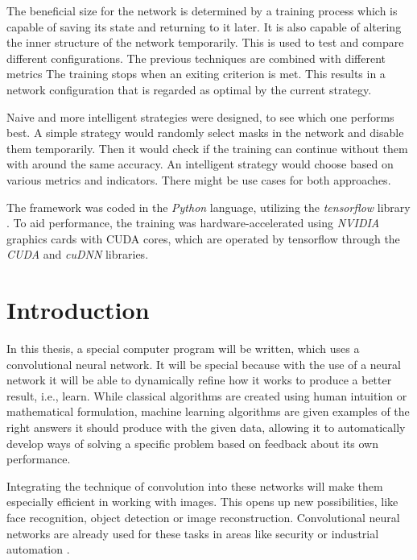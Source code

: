 \documentclass[12pt]{report}
\begin{document}
The beneficial size for the network is determined by a training process which is capable of saving its state and returning to it later. It is also capable of altering the inner structure of the network temporarily. This is used to test and compare different configurations. The previous techniques are combined with different metrics The training stops when an exiting criterion is met. This results in a network configuration that is regarded as optimal by the current strategy.

Naive and more intelligent strategies were designed, to see which one performs best. A simple strategy would randomly select masks in the network and disable them temporarily. Then it would check if the training can continue without them with around the same accuracy. An intelligent strategy would choose based on various metrics and indicators. There might be use cases for both approaches.

The framework was coded in the \textit{Python} language, utilizing the \textit{tensorflow} library \cite{tensorflow2015-whitepaper}. To aid performance, the training was hardware-accelerated using \textit{NVIDIA} graphics cards with CUDA cores, which are operated by tensorflow through the \textit{CUDA} and \textit{cuDNN} libraries.

\chapter*{Introduction}

In this thesis, a special computer program will be written, which uses a convolutional neural network. It will be special because with the use of a neural network it will be able to dynamically refine how it works to produce a better result, i.e., learn. While classical algorithms are created using human intuition or mathematical formulation, machine learning algorithms are given examples of the right answers it should produce with the given data, allowing it to automatically develop ways of solving a specific problem based on feedback about its own performance.

Integrating the technique of convolution into these networks will make them especially efficient in working with images. This opens up new possibilities, like face recognition, object detection or image reconstruction. Convolutional neural networks are already used for these tasks in areas like security or industrial automation \cite{applications}.
\end{document}
